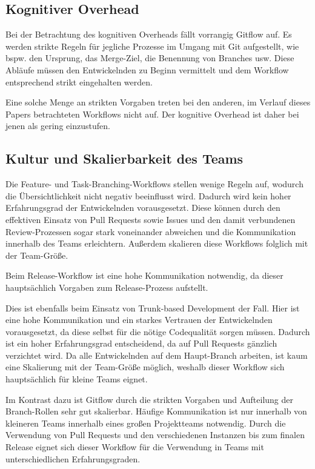 \subsection{Kognitiver Overhead}

Bei der Betrachtung des kognitiven Overheads fällt vorrangig Gitflow auf. Es werden strikte Regeln für jegliche Prozesse im Umgang mit Git aufgestellt, wie bspw. den Ursprung, das Merge\hyp Ziel, die Benennung von Branches usw. Diese Abläufe müssen den Entwickelnden zu Beginn vermittelt und dem Workflow entsprechend strikt eingehalten werden.

Eine solche Menge an strikten Vorgaben treten bei den anderen, im Verlauf dieses Papers betrachteten Workflows nicht auf. Der kognitive Overhead ist daher bei jenen als gering einzustufen.


\subsection{Kultur und Skalierbarkeit des Teams}

Die Feature- und Task\hyp Branching\hyp Workflows stellen wenige Regeln auf, wodurch die Übersichtlichkeit nicht negativ beeinflusst wird. Dadurch wird kein hoher Erfahrungsgrad der Entwickelnden vorausgesetzt. Diese können durch den effektiven Einsatz von Pull Requests sowie Issues und den damit verbundenen Review\hyp Prozessen sogar stark voneinander abweichen und die Kommunikation innerhalb des Teams erleichtern. Außerdem skalieren diese Workflows folglich mit der Team\hyp Größe.

Beim Release\hyp Workflow ist eine hohe Kommunikation notwendig, da dieser hauptsächlich Vorgaben zum Release\hyp Prozess aufstellt. 

Dies ist ebenfalls beim Einsatz von Trunk\hyp based Development der Fall. Hier ist eine hohe Kommunikation und ein starkes Vertrauen der Entwickelnden vorausgesetzt, da diese selbst für die nötige Codequalität sorgen müssen. Dadurch ist ein hoher Erfahrungsgrad entscheidend, da auf Pull Requests gänzlich verzichtet wird. Da alle Entwickelnden auf dem Haupt\hyp Branch arbeiten, ist kaum eine Skalierung mit der Team\hyp Größe möglich, weshalb dieser Workflow sich hauptsächlich für kleine Teams eignet.

Im Kontrast dazu ist Gitflow durch die strikten Vorgaben und Aufteilung der Branch\hyp Rollen sehr gut skalierbar. Häufige Kommunikation ist nur innerhalb von kleineren Teams innerhalb eines großen Projektteams notwendig. Durch die Verwendung von Pull Requests und den verschiedenen Instanzen bis zum finalen Release eignet sich dieser Workflow für die Verwendung in Teams mit unterschiedlichen Erfahrungsgraden.

